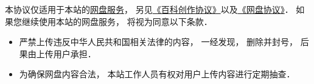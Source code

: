 
本协议仅适用于本站的\href{http://example.com}{网盘服务}， 另见\href{https://wuli.wiki/online/licens.html}{《百科创作协议》}以及\href{http://www.example.com}{《网盘协议》}． 如果您继续使用本站的网盘服务， 将视为同意以下条款．

\begin{itemize}
\item 严禁上传违反中华人民共和国相关法律的内容， 一经发现， 删除并封号， 后果由上传用户承担．
\item 为确保网盘内容合法， 本站工作人员有权对用户上传内容进行定期抽查．
\end{itemize}

